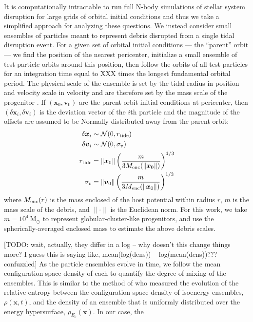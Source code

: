 \documentclass[letterpaper,12pt,preprint]{aastex}
\newcommand{\msun}{\ensuremath{\mathrm{M}_\odot}}
\newcommand{\bs}[1]{\boldsymbol{#1}}
\begin{document}

It is computationally intractable to run full N-body simulations of stellar system disruption for large grids of orbital initial conditions and thus we take a simplified approach for analyzing these questions. We instead consider small ensembles of particles meant to represent debris disrupted from a single tidal disruption event. For a given set of orbital initial conditions --- the ``parent'' orbit --- we find the position of the nearest pericenter, initialize a small ensemble of test particle orbits around this position, then follow the orbits of all test particles for an integration time equal to XXX times the longest fundamental orbital period. The physical scale of the ensemble is set by the tidal radius in position and velocity scale in velocity and are therefore set by the mass scale of the progenitor \citep[e.g.,][]{johnston98, apw14}. If $(\bs{x}_0,\bs{v}_0)$ are the parent orbit initial conditions at pericenter, then $(\delta\bs{x}_i,\delta\bs{v}_i)$ is the deviation vector of the $i$th particle and the magnitude of the offsets are assumed to be Normally distributed away from the parent orbit:
\begin{align}
	\delta\bs{x}_i &\sim \mathcal{N}(0, r_{\rm tide})\\
	\delta\bs{v}_i &\sim \mathcal{N}(0, \sigma_v)\\
	r_{\rm tide} &= \|\bs{x}_0\| \left(\frac{m}{3M_{\rm enc}(\|\bs{x}_0\|)}\right)^{1/3} \\
	\sigma_v &= \|\bs{v}_0\|\left(\frac{m}{3M_{\rm enc}(\|\bs{x}_0\|)}\right)^{1/3} 
\end{align}
where $M_{\rm enc}(r)$ is the mass enclosed of the host potential within radius $r$, $m$ is the mass scale of the debris, and $\|\cdot \|$ is the Euclidean norm. For this work, we take $m=10^4~\msun$ to represent globular-cluster-like progenitors, and use the spherically-averaged enclosed mass to estimate the above debris scales.

[TODO: wait, actually, they differ in a log -- why doesn't this change things more? I guess this is saying like, mean(log(dens)) ~ log(mean(dens))??? confuzzled]
As the particle ensembles evolve in time, we follow the mean configuration-space density of each to quantify the degree of mixing of the ensembles. This is similar to the method of \citet{merritt96} who measured the evolution of the relative entropy between the configuration-space density of isoenergy ensembles, $\rho(\bs{x},t)$, and the density of an ensemble that is uniformly distributed over the energy hypersurface, $\rho_{E_0}(\bs{x})$. In our case, the
\end{document}
